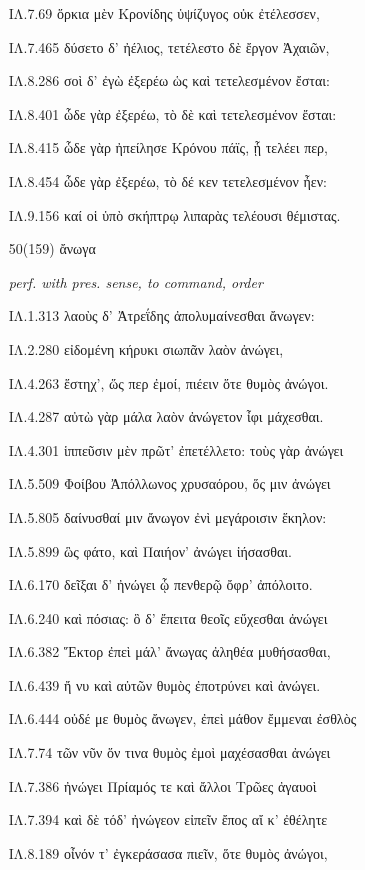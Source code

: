 \begin{enumerate}
{ΙΛ.7.69 ὅρκια μὲν Κρονίδης ὑψίζυγος οὐκ ἐτέλεσσεν,

ΙΛ.7.465 δύσετο δ' ἠέλιος, τετέλεστο δὲ ἔργον Ἀχαιῶν,

ΙΛ.8.286 σοὶ δ' ἐγὼ ἐξερέω ὡς καὶ τετελεσμένον ἔσται:

ΙΛ.8.401 ὧδε γὰρ ἐξερέω, τὸ δὲ καὶ τετελεσμένον ἔσται:

ΙΛ.8.415 ὧδε γὰρ ἠπείλησε Κρόνου πάϊς, ᾗ τελέει περ,

ΙΛ.8.454 ὧδε γὰρ ἐξερέω, τὸ δέ κεν τετελεσμένον ἦεν:

ΙΛ.9.156 καί οἱ ὑπὸ σκήπτρῳ λιπαρὰς τελέουσι θέμιστας.

}

\clearpage
\item[\large 50(159)]{\large \g ἄνωγα}

\hspace{0.2cm} \textit{ perf. with pres. sense, to command, order  }

{\g

ΙΛ.1.313 λαοὺς δ' Ἀτρεΐδης ἀπολυμαίνεσθαι ἄνωγεν:

ΙΛ.2.280 εἰδομένη κήρυκι σιωπᾶν λαὸν ἀνώγει,

ΙΛ.4.263 ἕστηχ', ὥς περ ἐμοί, πιέειν ὅτε θυμὸς ἀνώγοι.

ΙΛ.4.287 αὐτὼ γὰρ μάλα λαὸν ἀνώγετον ἶφι μάχεσθαι.

ΙΛ.4.301 ἱππεῦσιν μὲν πρῶτ' ἐπετέλλετο: τοὺς γὰρ ἀνώγει

ΙΛ.5.509 Φοίβου Ἀπόλλωνος χρυσαόρου, ὅς μιν ἀνώγει

ΙΛ.5.805 δαίνυσθαί μιν ἄνωγον ἐνὶ μεγάροισιν ἕκηλον:

ΙΛ.5.899 ὣς φάτο, καὶ Παιήον' ἀνώγει ἰήσασθαι.

ΙΛ.6.170 δεῖξαι δ' ἠνώγει ᾧ πενθερῷ ὄφρ' ἀπόλοιτο.

ΙΛ.6.240 καὶ πόσιας: ὃ δ' ἔπειτα θεοῖς εὔχεσθαι ἀνώγει

ΙΛ.6.382 Ἕκτορ ἐπεὶ μάλ' ἄνωγας ἀληθέα μυθήσασθαι,

ΙΛ.6.439 ἤ νυ καὶ αὐτῶν θυμὸς ἐποτρύνει καὶ ἀνώγει.

ΙΛ.6.444 οὐδέ με θυμὸς ἄνωγεν, ἐπεὶ μάθον ἔμμεναι ἐσθλὸς

ΙΛ.7.74 τῶν νῦν ὅν τινα θυμὸς ἐμοὶ μαχέσασθαι ἀνώγει

ΙΛ.7.386 ἠνώγει Πρίαμός τε καὶ ἄλλοι Τρῶες ἀγαυοὶ

ΙΛ.7.394 καὶ δὲ τόδ' ἠνώγεον εἰπεῖν ἔπος αἴ κ' ἐθέλητε

ΙΛ.8.189 οἶνόν τ' ἐγκεράσασα πιεῖν, ὅτε θυμὸς ἀνώγοι,

}
\end{enumerate}
